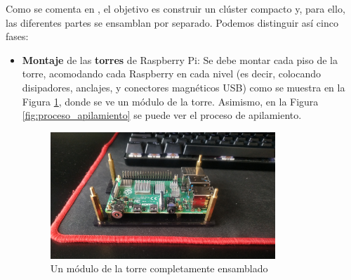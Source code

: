 Como se comenta en , el objetivo es construir un clúster compacto y, para ello, las diferentes partes se ensamblan por separado. Podemos distinguir así cinco fases:
\begin{itemize}
    \item \textbf{Montaje} de las \textbf{torres} de Raspberry Pi: Se debe montar cada piso de la torre, acomodando cada Raspberry en cada nivel (es decir, colocando disipadores, anclajes, y conectores magnéticos USB) como se muestra en la Figura \ref{fig:modulo_raspi_torre}, donde se ve un módulo de la torre. Asimismo, en la Figura \ref{fig:proceso_apilamiento} se puede ver el proceso de apilamiento.

    \begin{figure}[h!]
    \centering
    \includegraphics[width=0.8\textwidth]{img/modulo_raspi_torre.jpg}
    \caption{Un módulo de la torre completamente ensamblado}
    \label{fig:modulo_raspi_torre}
    \end{figure}


\end{itemize}
